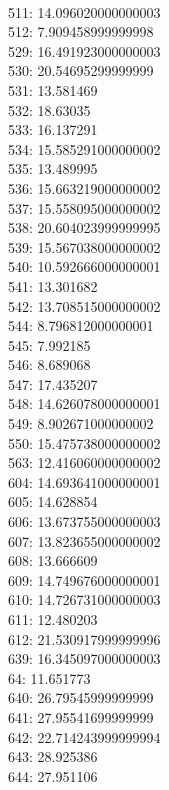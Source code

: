 \begin{multicols}{4}
  \\ 511: 14.096020000000003
  \\ 512: 7.909458999999998
  \\ 529: 16.491923000000003
  \\ 530: 20.54695299999999
  \\ 531: 13.581469
  \\ 532: 18.63035
  \\ 533: 16.137291
  \\ 534: 15.585291000000002
  \\ 535: 13.489995
  \\ 536: 15.663219000000002
  \\ 537: 15.558095000000002
  \\ 538: 20.604023999999995
  \\ 539: 15.567038000000002
  \\ 540: 10.592666000000001
  \\ 541: 13.301682
  \\ 542: 13.708515000000002
  \\ 544: 8.796812000000001
  \\ 545: 7.992185
  \\ 546: 8.689068
  \\ 547: 17.435207
  \\ 548: 14.626078000000001
  \\ 549: 8.902671000000002
  \\ 550: 15.475738000000002
  \\ 563: 12.416060000000002
  \\ 604: 14.693641000000001
  \\ 605: 14.628854
  \\ 606: 13.673755000000003
  \\ 607: 13.823655000000002
  \\ 608: 13.666609
  \\ 609: 14.749676000000001
  \\ 610: 14.726731000000003
  \\ 611: 12.480203
  \\ 612: 21.530917999999996
  \\ 639: 16.345097000000003
  \\ 64: 11.651773
  \\ 640: 26.79545999999999
  \\ 641: 27.95541699999999
  \\ 642: 22.714243999999994
  \\ 643: 28.925386
  \\ 644: 27.951106

\end{multicols}
